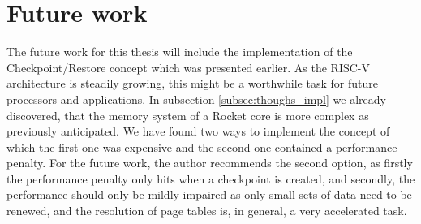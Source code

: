 \chapter{Future work}\label{chap:future_work}
The future work for this thesis will include the implementation
of the Checkpoint/Restore concept which was presented earlier.
As the RISC-V architecture is steadily growing, this might be
a worthwhile task for future processors and applications.
In subsection \ref{subsec:thoughs_impl} we already
discovered, that the memory system of a Rocket core is more
complex as previously anticipated.
We have found two ways to implement the concept of which
the first one was expensive and the second one contained
a performance penalty. For the future work, the author
recommends the second option, as firstly the performance penalty
only hits when a checkpoint is created, and secondly,
the performance should only be mildly impaired as
only small sets of data need to be renewed, and the
resolution of page tables is, in general, a very accelerated
task.